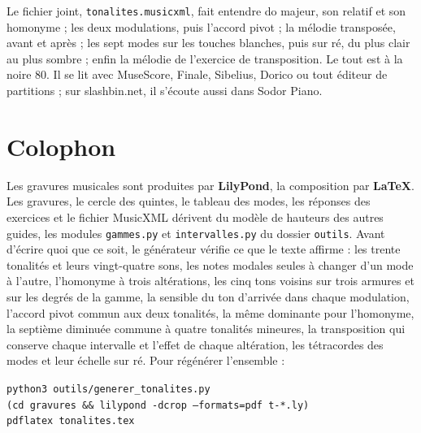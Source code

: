 \documentclass[a4paper,11pt]{article}
\begin{document}
Le fichier joint, \texttt{tonalites.musicxml}, fait entendre do majeur, son
relatif et son homonyme ; les deux modulations, puis l'accord pivot ; la
mélodie transposée, avant
et après ; les sept modes sur les touches blanches, puis sur ré, du plus clair
au plus sombre ; enfin la mélodie de l'exercice de transposition. Le tout est
à la noire 80. Il se lit avec MuseScore, Finale, Sibelius, Dorico ou tout
éditeur de partitions ; sur slashbin.net, il s'écoute aussi dans Sodor Piano.

\section*{Colophon}

Les gravures musicales sont produites par \textbf{LilyPond}, la composition
par \textbf{\LaTeX}. Les gravures, le cercle des quintes, le tableau des modes,
les réponses des exercices et le fichier MusicXML dérivent du modèle de
hauteurs des autres guides, les modules \texttt{gammes.py} et
\texttt{intervalles.py} du dossier \texttt{outils}. Avant d'écrire quoi que ce
soit, le générateur vérifie ce que le texte affirme : les trente tonalités et
leurs vingt-quatre sons, les notes modales seules à changer d'un mode à
l'autre, l'homonyme à trois altérations, les cinq tons voisins sur trois
armures et sur les degrés de la gamme, la sensible du ton d'arrivée dans
chaque modulation, l'accord pivot commun aux deux tonalités, la même
dominante pour l'homonyme, la septième diminuée commune à quatre tonalités
mineures, la transposition qui conserve chaque intervalle et l'effet
de chaque altération, les tétracordes des modes et leur échelle sur ré. Pour
régénérer l'ensemble :

\begin{center}
\texttt{python3 outils/generer\_tonalites.py}\\
\texttt{(cd gravures \&\& lilypond -dcrop --formats=pdf t-*.ly)}\\
\texttt{pdflatex tonalites.tex}
\end{center}
\end{document}
